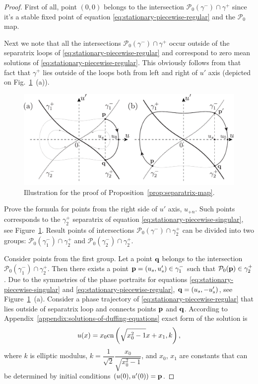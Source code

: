 \begin{proof}
	First of all, point $(0, 0)$ belongs to the intersection $\mathcal{P}_0(\gamma^-) \cap \gamma^+$ since it's a stable fixed point of equation \eqref{eq:stationary-piecewise-regular} and the $\mathcal{P}_0$ map.

	Next we note that all the intersections $\mathcal{P}_0(\gamma^-) \cap \gamma^+$ occur outside of the separatrix loops of \eqref{eq:stationary-piecewise-regular} and correspond to zero mean solutions of \eqref{eq:stationary-piecewise-regular}.
	This obviously follows from that fact that $\gamma^+$ lies outside of the loops both from left and right of $u'$ axis (depicted on Fig.~\ref{fig:separatrix-map}~(a)).
	\begin{figure}[h]
	\centering
		\includegraphics[scale = 1]{pic/separatrix map}
		\caption{Illustration for the proof of Proposition~\ref{prop:separatrix-map}.}
	\label{fig:separatrix-map}
	\end{figure}
	
	Prove the formula for points from the right side of $u'$ axis, $u_{+n}$.
	Such points corresponds to the $\gamma_2^+$ separatrix of equation \eqref{eq:stationary-piecewise-singular}, see Figure~\ref{fig:separatrix-map}.
	Result points of intersections $\mathcal{P}_0(\gamma^-) \cap \gamma_2^+$ can be divided into two groups: $\mathcal{P}_0(\gamma_1^-) \cap \gamma_2^+$ and $\mathcal{P}_0(\gamma_2^-) \cap \gamma_2^+$.

	Consider points from the first group.
	Let a point $\vb{q}$ belongs to the intersection $\mathcal{P}_0(\gamma_1^-) \cap \gamma_2^+$.
	Then there exists a point $\vb{p} = (u_s, u_s') \in \gamma_1^-$ such that $\mathcal{P}_0(\vb{p}) \in \gamma_2^+$.
	Due to the symmetries of the phase portraits for equations \eqref{eq:stationary-piecewise-singular} and \eqref{eq:stationary-piecewise-regular}, $\vb{q} = (u_s, -u_s')$, see Figure~\ref{fig:separatrix-map}~(a).
	Consider a phase trajectory of \eqref{eq:stationary-piecewise-regular} that lies outside of separatrix loop and connects points $\vb{p}$ and $\vb{q}$.
	According to Appendix~\ref{appendix:solutions-of-duffing-equations} exact form of the solution is
	\begin{equation}
		u(x) = x_0 \mathrm{cn} \left( \sqrt{x_0^2 - 1} x + x_1, k \right),
	\label{eq:stationary-piecewise-regular-solution}
	\end{equation}
	where $k$ is elliptic modulus, $k = \dfrac{1}{\sqrt{2}} \dfrac{x_0}{\sqrt{x_0^2 - 1}}$, and $x_0$, $x_1$ are constants that can be determined by initial conditions $(u(0), u'(0)) = \vb{p}$.
	

\end{proof}
